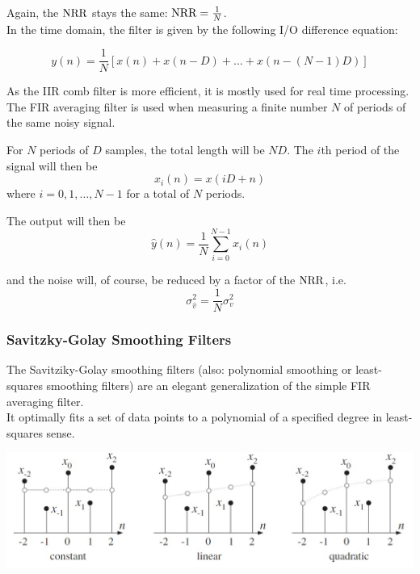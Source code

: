 Again, the $\operatorname{\text{NRR}}$ stays the same: $\operatorname{\text{NRR}} = \frac{1}{N}$. \\

In the time domain, the filter is given by the following I/O difference equation:

\begin{equation*}
	y(n) = \frac{1}{N} \left[ x(n)+x(n-D)+\ldots+x(n-(N-1)D) \right]
\end{equation*}

As the IIR comb filter is more efficient, it is mostly used for real time
processing. The FIR averaging filter is used when measuring a finite number 
$N$ of periods of the same noisy signal.

For $N$ periods of $D$ samples, the total length will be $ND$. The $i$th period
of the signal will then be
\begin{equation*}
	x_i(n) = x(iD+n)
\end{equation*}
where $i=0,1,\ldots,N-1$ for a total of $N$ periods.

The output will then be
\begin{equation*}
	\hat{y}(n)=\frac{1}{N}\sum_{i=0}^{N-1}x_i(n)
\end{equation*}

and the noise will, of course, be reduced by a factor of the $\operatorname{\text{NRR}}$, i.e.
\begin{equation*}
	\sigma_{\hat{v}}^2 = \frac{1}{N} \sigma_v^2
\end{equation*}


\subsubsection{Savitzky-Golay Smoothing Filters}

The Savitziky-Golay smoothing filters (also: polynomial smoothing or 
least-squares smoothing filters) are an elegant generalization of the
simple FIR averaging filter. \\

It optimally fits a set of data points to a polynomial of a specified 
degree in least-squares sense.

\begin{center}
	\includegraphics[width=\linewidth]{images/SignProcApp_SavitzkyGolay.jpg}
\end{center}

